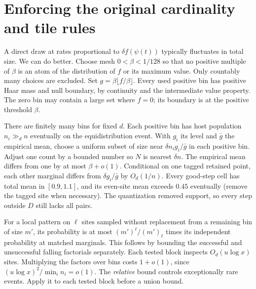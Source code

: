 \documentclass[12pt,letterpaper]{article}
\newcommand{\pagepart}[1]{\clearpage\section{#1}}
\begin{document}
\pagepart{Enforcing the original cardinality and tile rules}
A direct draw at rates proportional to \(\delta f(\psi(t))\) typically fluctuates in total size. We can do better. Choose mesh \(0<\beta<1/128\) so that no positive multiple of \(\beta\) is an atom of the distribution of \(f\) or its maximum value. Only countably many choices are excluded. Set \(g=\beta\lfloor f/\beta\rfloor\). Every used positive bin has positive Haar mass and null boundary, by continuity and the intermediate value property. The zero bin may contain a large set where \(f=0\); its boundary is at the positive threshold \(\beta\).

There are finitely many bins for fixed \(d\). Each positive bin has host population \(n_i\gg_d n\) eventually on the equidistribution event. With \(g_i\) its level and \(\bar g\) the empirical mean, choose a uniform subset of size near \(\delta n_i g_i/\bar g\) in each positive bin. Adjust one count by a bounded number so \(N\) is nearest \(\delta n\). The empirical mean differs from one by at most \(\beta+o(1)\). Conditional on one tagged retained point, each other marginal differs from \(\delta g_i/\bar g\) by \(O_d(1/n)\). Every good-step cell has total mean in \([0.9,1.1]\), and its even-site mean exceeds \(0.45\) eventually (remove the tagged site when necessary). The quantization removed support, so every step outside \(D\) still lacks all pairs.

For a local pattern on \(\ell\) sites sampled without replacement from a remaining bin of size \(m'\), its probability is at most \((m')^\ell/(m')_\ell\) times its independent probability at matched marginals. This follows by bounding the successful and unsuccessful falling factorials separately. Each tested block inspects \(O_d(u\log x)\) sites. Multiplying the factors over bins costs \(1+o(1)\), since \((u\log x)^2/\min_i n_i=o(1)\). The \emph{relative} bound controls exceptionally rare events. Apply it to each tested block before a union bound.
\end{document}
